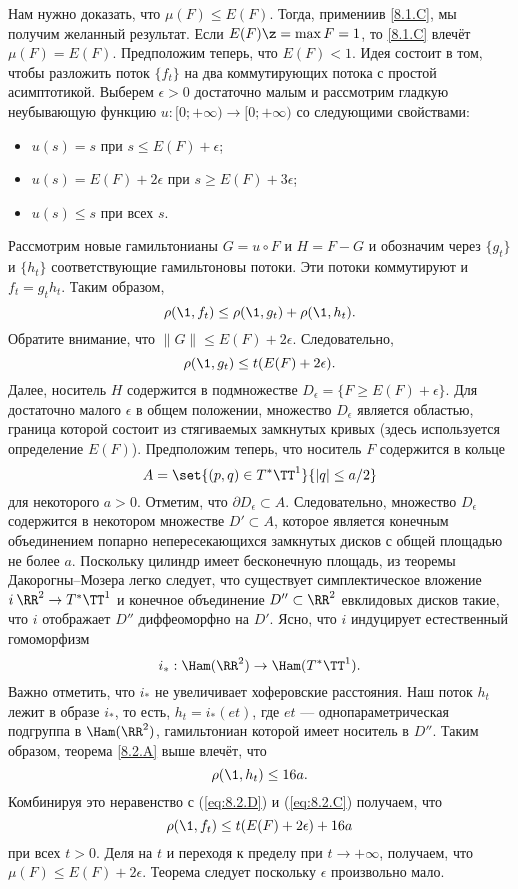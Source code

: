 Нам нужно доказать, что $\mu (F) \le E (F)$.
Тогда, примениив \ref{8.1.C}, мы получим желанный результат.
Если $E (F) \z= \max F = 1$, то \ref{8.1.C} влечёт $\mu (F) = E (F)$.
Предположим теперь, что $E (F) <1$.
Идея состоит в том, чтобы разложить поток $\{f_t\}$ на два коммутирующих потока с простой асимптотикой.
Выберем $\epsilon> 0$ достаточно малым и рассмотрим гладкую неубывающую функцию $u: [0; + \infty) \to [0; + \infty)$ со следующими свойствами: 
\begin{itemize}
\item $u (s) = s$ при $s \le E (F) + \epsilon$;
\item $u (s) = E (F) + 2\epsilon$ при $s \ge E (F) + 3\epsilon$;
\item $u (s) \le s$ при всех $s$.
\end{itemize}
Рассмотрим новые гамильтонианы $G = u \circ F$ и $H = F - G$ и обозначим через $\{g_t\}$ и $\{h_t\}$ соответствующие гамильтоновы потоки.
Эти потоки коммутируют и $f_t = g_t h_t$.
Таким образом, 
\begin{equation}\rho (\1, f_t) \le \rho (\1, g_t) + \rho (\1, h_t).
\label{eq:8.2.C}
\end{equation}
Обратите внимание, что $\| G \| \le E (F) + 2\epsilon$.
Следовательно, 
\begin{equation}
 \rho (\1, g_t) \le t (E (F) + 2\epsilon).
\label{eq:8.2.D}
\end{equation}
Далее, носитель $H$ содержится в подмножестве $D_\epsilon = \{F \ge E (F) + \epsilon\}$.
Для достаточно малого $\epsilon$ в общем положении, множество $D_\epsilon$ является областью, граница которой состоит из стягиваемых замкнутых кривых (здесь используется определение $E(F)$).
Предположим теперь, что носитель $F$ содержится в кольце 
\[A = \set{(p, q) \in T^\ast\TT^1}{| q | \le a / 2}\]
для некоторого $a> 0$.
Отметим, что $\partial D_\epsilon \subset A$.
Следовательно, множество $D_\epsilon$ содержится в некотором множестве $D' \subset A$, которое является конечным объединением попарно непересекающихся замкнутых дисков с общей площадью не более $a$.
Поскольку цилиндр имеет бесконечную площадь, из теоремы Дакорогны--Мозера \cite[1.6]{HZ} легко следует, что существует симплектическое вложение $i\: \RR^2 \to T^\ast \TT^1$ и конечное объединение $D'' \subset \RR^2$ евклидовых дисков такие, что $i$ отображает $D''$ диффеоморфно на $D'$.
Ясно, что $i$ индуцирует естественный гомоморфизм 
\[i_\ast: \Ham (\RR^2) \to \Ham (T^\ast \TT^1).\]
Важно отметить, что $i_\ast$ не увеличивает хоферовские расстояния.
Наш поток $h_t$ лежит в образе $i_\ast$, то есть, $h_t = i_\ast (et)$, где $et$ --- однопараметрическая подгруппа в $\Ham (\RR^2)$, гамильтониан которой имеет носитель в $D''$.
Таким образом, теорема \ref{8.2.A} выше влечёт, что 
\[
\rho (\1, h_t) \le 16a.
\]
Комбинируя это неравенство с (\ref{eq:8.2.D}) и (\ref{eq:8.2.C}) получаем, что
\begin{equation}\rho (\1, f_t) \le t (E (F) + 2\epsilon) + 16a 
\label{eq:8.2.E} 
\end{equation}
при всех $t> 0$.
Деля на $t$ и переходя к пределу при $t \to + \infty$, получаем, что $\mu (F) \le E (F) + 2\epsilon$.
Теорема следует поскольку $\epsilon$ произвольно мало.
\qeds

